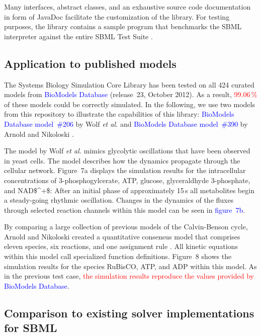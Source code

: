 \documentclass[10pt]{bmc_article}
\newenvironment{bmcformat}{\fussy\setboolean{publ}{true}}{\fussy}
\newcommand{\TODO}[1]{\textcolor{red}{#1}}
\newcommand{\COR}[1]{\textcolor{blue}{#1}}
\begin{document}
\begin{bmcformat}
Many interfaces, abstract classes, and an exhaustive source code documentation
in form of JavaDoc facilitate the customization of the library.
For testing purposes, the library contains a sample program that benchmarks the
\acs{SBML} interpreter against the entire SBML Test Suite \COR{\cite{SBMLtestSuite2013}}.


\subsection*{Application to published models}

The Systems Biology Simulation Core Library has been tested on all 424 curated
models from \COR{BioModels Database} \cite{Novere2006a} (release~23, October 2012).
As a result, \TODO{99.06\,\%} of these models could be correctly simulated.
In the following, we use two models from this repository to illustrate the
capabilities of this library:
\COR{BioModels Database model~\#206} by Wolf \emph{et al.} \cite{Wolf2000} and \COR{BioModels Database model~\#390} by Arnold 
and Nikoloski \cite{Arnold2011}.

The model by Wolf \emph{et al.} \cite{Wolf2000} mimics glycolytic oscillations
that have been observed in yeast cells.
The model describes how the dynamics propagate through the cellular network.
Figure~7a displays the simulation results for the intracellular concentrations
of 3-phosphogylcerate, \acs{ATP}, glucose, glyceraldhyde 3-phosphate, and \acs{NAD$^+$}:
After an initial phase of approximately 15\,s all metabolites begin a
steady-going rhythmic oscillation.
Changes in the dynamics of the fluxes through selected reaction channels within
this model can be seen in \COR{figure~7b}. 

By comparing a large collection of previous models of the Calvin-Benson
cycle, Arnold and Nikoloski created a quantitative consensus model that
comprises eleven species, six reactions, and one assignment rule
\cite{Arnold2011}.
All kinetic equations within this model call specialized function definitions.
Figure~8 shows the simulation results for the species \acs{RuBisCO},
\acs{ATP}, and \acs{ADP} within this model.
As in the previous test case, \TODO{the simulation results reproduce the values provided by} \COR{BioModels Database}.  

\subsection*{Comparison to existing solver implementations for SBML}


\end{bmcformat}
\end{document}
